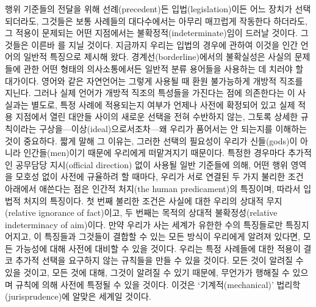 행위 기준들의 전달을 위해 선례(precedent)든 입법(legislation)이든 어느
장치가 선택되더라도, 그것들은 보통 사례들의 대다수에서는 아무리 매끄럽게
작동한다 하더라도, 그 적용이 문제되는 어떤 지점에서는
불확정적(indeterminate)임이 드러날 것이다. 그것들은 이른바 를 지닐 것이다. 지금까지 우리는 입법의 경우에 관하여
이것을 인간 언어의 일반적 특징으로 제시해 왔다. 경계선(borderline)에서의
불확실성은 사실의 문제들에 관한 어떤 형태의 의사소통에서든 일반적 분류
용어들을 사용하는 데 치러야 할 대가이다. 영어와 같은 자연언어는 그렇게
사용될 때 환원 불가능하게 개방적 직조를 지닌다. 그러나 실제 언어가
개방적 직조의 특성들을 가진다는 점에 의존한다는 이 사실과는 별도로, 특정
사례에 적용되는지 여부가 언제나 사전에 확정되어 있고 실제 적용 지점에서
열린 대안들 사이의 새로운 선택을 전혀 수반하지 않는, 그토록 상세한
규칙이라는 구상을---이상(ideal)으로서조차---왜 우리가 품어서는 안
되는지를 이해하는 것이 중요하다. 짧게 말해 그 이유는, 그러한 선택의
필요성이 우리가 신들(gods)이 아니라 인간들(men)이기 때문에 우리에게
떠맡겨지기 때문이다. 특정한 경우마다 추가적인 공무담당 지시(official
direction) 없이 사용될 일반 기준들에 의해, 어떤 행위 영역을 모호성 없이
사전에 규율하려 할 때마다, 우리가 서로 연결된 두 가지 불리한 조건
아래에서 애쓴다는 점은 인간적 처지(the human predicament)의 특징이며,
따라서 입법적 처지의 특징이다. 첫 번째 불리한 조건은 사실에 대한 우리의
상대적 무지(relative ignorance of fact)이고, 두 번째는 목적의 상대적
불확정성(relative indeterminacy of aim)이다. 만약 우리가 사는 세계가
유한한 수의 특징들로만 특징지어지고, 이 특징들과 그것들이 결합할 수 있는
모든 방식이 우리에게 알려져 있다면, 모든 가능성에 대해 사전에 대비할 수
있을 것이다. 우리는 특정 사례들에 대한 적용이 결코 추가적 선택을
요구하지 않는 규칙들을 만들 수 있을 것이다. 모든 것이 알려질 수 있을
것이고, 모든 것에 대해, 그것이 알려질 수 있기 때문에, 무언가가 행해질 수
있으며 규칙에 의해 사전에 특정될 수 있을 것이다. 이것은
‘기계적(mechanical)’ 법리학(jurisprudence)에 알맞은 세계일 것이다.

